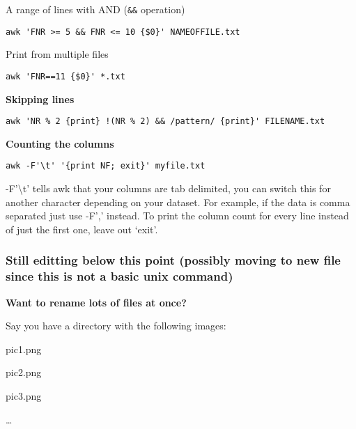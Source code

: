 \documentclass[
  letterpaper,
  DIV=11,
  numbers=noendperiod]{scrreprt}
\begin{document}
A range of lines with AND (\texttt{\&\&} operation)

\begin{verbatim}
awk 'FNR >= 5 && FNR <= 10 {$0}' NAMEOFFILE.txt
\end{verbatim}

Print from multiple files

\begin{verbatim}
awk 'FNR==11 {$0}' *.txt
\end{verbatim}

\textbf{Skipping lines}

\begin{verbatim}
awk 'NR % 2 {print} !(NR % 2) && /pattern/ {print}' FILENAME.txt
\end{verbatim}

\textbf{Counting the columns}

\begin{verbatim}
awk -F'\t' '{print NF; exit}' myfile.txt
\end{verbatim}

-F'\textbackslash t' tells awk that your columns are tab delimited, you
can switch this for another character depending on your dataset. For
example, if the data is comma separated just use -F',' instead. To print
the column count for every line instead of just the first one, leave out
`exit'.

\hypertarget{still-editting-below-this-point-possibly-moving-to-new-file-since-this-is-not-a-basic-unix-command}{%
\subsubsection*{\texorpdfstring{\textbf{Still editting below this point
(possibly moving to new file since this is not a basic unix
command)}}{Still editting below this point (possibly moving to new file since this is not a basic unix command)}}\label{still-editting-below-this-point-possibly-moving-to-new-file-since-this-is-not-a-basic-unix-command}}

\textbf{Want to rename lots of files at once?}

Say you have a directory with the following images:

pic1.png

pic2.png

pic3.png

\ldots{}
\end{document}
